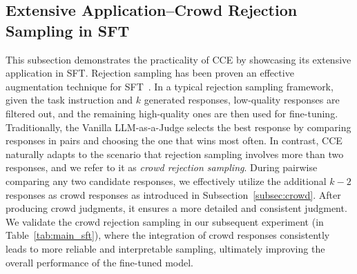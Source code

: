 \subsection{Extensive Application--Crowd Rejection Sampling in SFT}
\label{subsec:potential}
This subsection demonstrates the practicality of \textsc{CCE} by showcasing its extensive application in SFT.
Rejection sampling has been proven an effective augmentation technique for SFT~\citep{yuan2023scaling,zhu2023solving}. In a typical rejection sampling framework, given the task instruction and $k$ generated responses, low-quality responses are filtered out, and the remaining high-quality ones are then used for fine-tuning.
Traditionally, the Vanilla LLM-as-a-Judge selects the best response by comparing responses in pairs and choosing the one that wins most often. 
In contrast, \textsc{CCE} naturally adapts to the scenario that rejection sampling involves more than two responses, and we refer to it as \textit{crowd rejection sampling}. During pairwise comparing any two candidate responses, we effectively utilize the additional $k-2$ responses as crowd responses as introduced in Subsection~\ref{subsec:crowd}. After producing crowd judgments, it ensures a more detailed and consistent judgment.
We validate the crowd rejection sampling in our subsequent experiment (in Table~\ref{tab:main_sft}), where the integration of crowd responses consistently leads to more reliable and interpretable sampling, ultimately improving the overall performance of the fine-tuned model.